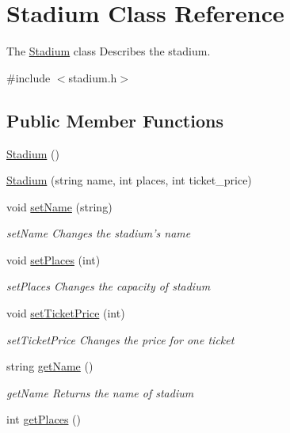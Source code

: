\hypertarget{class_stadium}{\section{Stadium Class Reference}
\label{class_stadium}
}


The \hyperlink{class_stadium}{Stadium} class Describes the stadium.  




{\ttfamily \#include $<$stadium.\-h$>$}

\subsection*{Public Member Functions}
\begin{DoxyCompactItemize}
\item 
\hyperlink{class_stadium_a590fc521914438820bf5ab2f27d2d749}{Stadium} ()
\item 
\hyperlink{class_stadium_a12f75b0989850194b734304a2fab3ccf}{Stadium} (string name, int places, int ticket\-\_\-price)
\item 
void \hyperlink{class_stadium_a5bcaff3a212c824de82c4985f1495b6a}{set\-Name} (string)
\begin{DoxyCompactList}\small\item\em set\-Name Changes the stadium's name \end{DoxyCompactList}\item 
void \hyperlink{class_stadium_a01331957387926db3554e72ea87366b5}{set\-Places} (int)
\begin{DoxyCompactList}\small\item\em set\-Places Changes the capacity of stadium \end{DoxyCompactList}\item 
void \hyperlink{class_stadium_a32da99b03478f37d0ab983c2934e68d8}{set\-Ticket\-Price} (int)
\begin{DoxyCompactList}\small\item\em set\-Ticket\-Price Changes the price for one ticket \end{DoxyCompactList}\item 
string \hyperlink{class_stadium_a1fc6559711c96b45e5c6e03cda5e5806}{get\-Name} ()
\begin{DoxyCompactList}\small\item\em get\-Name Returns the name of stadium \end{DoxyCompactList}\item 
int \hyperlink{class_stadium_aeaa0d2bb9cb57190582a670110b5409c}{get\-Places} ()

\end{DoxyCompactItemize}

